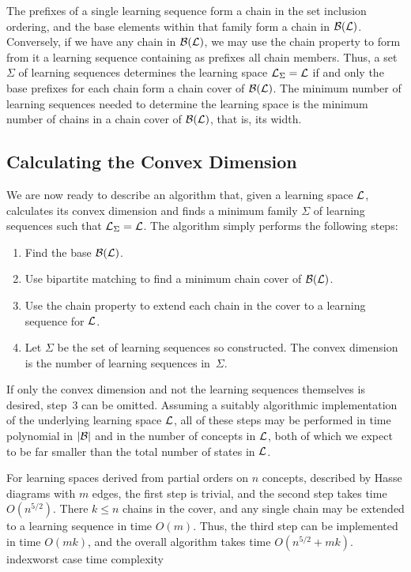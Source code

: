 \documentclass[11pt]{llncs}
\begin{document}
{The prefixes of a single learning sequence form a chain in the set inclusion ordering, and the base elements within that family form a chain in ${\cal B}({\cal L})$. Conversely, if we have any chain in ${\cal B}({\cal L})$, we may use the chain property to form from it a learning sequence containing as prefixes all chain members.  Thus, a set $\Sigma$ of learning sequences determines the learning space ${\cal L}_\Sigma={\cal L}$ if and only the base prefixes for each chain form a chain cover of ${\cal B}({\cal L})$.
The minimum number of learning sequences needed to determine the learning space is the minimum number of chains in a chain cover of ${\cal B}({\cal L})$, that is, its width.

\subsection{Calculating the Convex Dimension}

We are now ready to describe an algorithm that, given a learning space $\cal L$, calculates its convex dimension and finds a minimum family $\Sigma$ of learning sequences such that ${\cal L}_\Sigma=\cal L$. The algorithm simply performs the following steps:

\begin{enumerate}
\item Find the base ${\cal B}({\cal L})$.
\item Use bipartite matching to find a minimum chain cover of ${\cal B}({\cal L})$.
\item Use the chain property to extend each chain in the cover to a learning sequence for $\cal L$.
\item Let $\Sigma$ be the set of learning sequences so constructed. The convex dimension is the number of learning sequences in~$\Sigma$.
\end{enumerate}

If only the convex dimension and not the learning sequences themselves is desired, step~3 can be omitted.
Assuming a suitably algorithmic implementation of the underlying learning space $\cal L$, all of these steps may be performed in time polynomial in $|{\cal B}|$ and in the number of concepts in $\cal L$,
both of which we expect to be far smaller than the total number of states in $\cal L$.

For learning spaces derived from partial orders on $n$ concepts, described by Hasse diagrams with $m$ edges, the first step is trivial, and the second step takes time $O(n^{5/2})$. There $k\le n$ chains in the cover,
and any single chain may be extended to a learning sequence in time $O(m)$. Thus, the third step can be implemented in time $O(mk)$, and the overall algorithm takes time $O(n^{5/2}+mk)$.
index{worst case time complexity}

}
\end{document}
